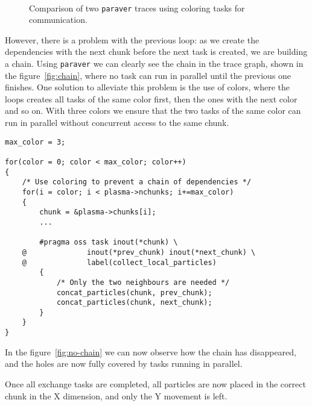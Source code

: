 \begin{figure}[h]
	\centering
	\\
	\caption{Comparison of two \texttt{paraver} traces using coloring tasks for 
	communication.}
\end{figure}
%
However, there is a problem with the previous loop: as we create the 
dependencies with the next chunk before the next task is created, we are 
building a chain. Using \texttt{paraver} we can clearly see the chain in the 
trace graph, shown in the figure~\ref{fig:chain}, where no task can run in 
parallel until the previous one finishes.  One solution to alleviate this 
problem is the use of colors, where the loops creates all tasks of the same 
color first, then the ones with the next color and so on.  With three colors we 
ensure that the two tasks of the same color can run in parallel without 
concurrent access to the same chunk.
%
\begin{lstlisting}
max_color = 3;

for(color = 0; color < max_color; color++)
{
	/* Use coloring to prevent a chain of dependencies */
	for(i = color; i < plasma->nchunks; i+=max_color)
	{
		chunk = &plasma->chunks[i];
		...

		#pragma oss task inout(*chunk) \
	@              inout(*prev_chunk) inout(*next_chunk) \
	@              label(collect_local_particles)
		{
			/* Only the two neighbours are needed */
			concat_particles(chunk, prev_chunk);
			concat_particles(chunk, next_chunk);
		}
	}
}
\end{lstlisting}
%
In the figure~\ref{fig:no-chain} we can now observe how the chain has 
disappeared, and the holes are now fully covered by tasks running in parallel.

Once all exchange tasks are completed, all particles are now placed in the 
correct chunk in the X dimension, and only the Y movement is left.

